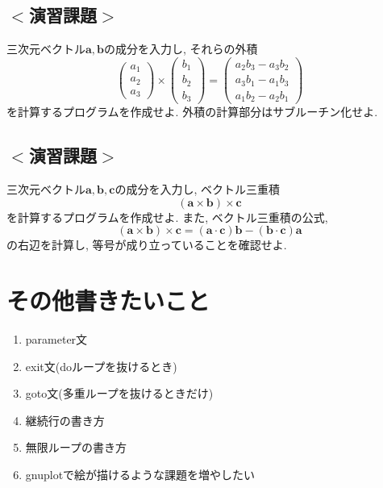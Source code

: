 \documentclass[a4j]{jsbook}
\begin{document}
\subsection*{$<$演習課題$>$}
三次元ベクトル$\bm{a}, \bm{b}$の成分を入力し, それらの外積
\begin{equation}
\begin{pmatrix}
a_1 \\ a_2 \\ a_3
\end{pmatrix}
\times
\begin{pmatrix}
b_1 \\ b_2 \\ b_3
\end{pmatrix}
=
\begin{pmatrix}
a_2b_3-a_3b_2 \\ a_3b_1-a_1b_3 \\ a_1b_2-a_2b_1
\end{pmatrix}
\end{equation}
を計算するプログラムを作成せよ.
外積の計算部分はサブルーチン化せよ.
%

\subsection*{$<$演習課題$>$}
三次元ベクトル$\bm{a}, \bm{b}, \bm{c}$の成分を入力し, ベクトル三重積
\begin{equation}
(\bm{a} \times \bm{b}) \times \bm{c}
\end{equation}
を計算するプログラムを作成せよ.
また, ベクトル三重積の公式,
\begin{equation}
(\bm{a} \times \bm{b}) \times \bm{c} = (\bm{a} \cdot \bm{c})\bm{b} - (\bm{b} \cdot \bm{c})\bm{a}
\end{equation}
の右辺を計算し, 等号が成り立っていることを確認せよ.
%

%
%
%


\section*{その他書きたいこと}
\begin{enumerate}
\item parameter文
\item exit文(doループを抜けるとき)
\item goto文(多重ループを抜けるときだけ)
\item 継続行の書き方
\item 無限ループの書き方
\item gnuplotで絵が描けるような課題を増やしたい
\end{enumerate}
\end{document}
